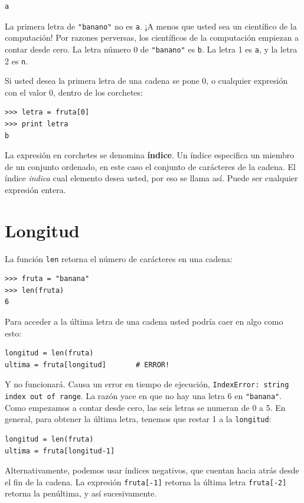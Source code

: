 \beforeverb
\begin{verbatim}
a
\end{verbatim}
\afterverb
%
La primera letra de \texttt{"banano"} no es \texttt{a}.  ¡A menos que usted
sea un científico de la computación! Por  razones perversas, los 
científicos de la computación empiezan a contar desde cero. La letra número 
0 de \texttt{"banano"} es \texttt{b}.  La letra 1 es \texttt{a}, y la letra
 2 es \texttt{n}.

Si usted desea la primera letra de una cadena se pone 0, o cualquier
expresión con el valor 0, dentro de los corchetes:


\beforeverb
\begin{verbatim}
>>> letra = fruta[0]
>>> print letra
b
\end{verbatim}
\afterverb
%
La expresión en corchetes se denomina {\bf índice}.  Un índice
especifica un miembro de un conjunto ordenado, en este caso el 
conjunto de carácteres de la cadena. El índice  {\em indica} cual
elemento desea usted, por eso se llama así. Puede ser cualquier expresión
entera.



\section{Longitud}

La función  \texttt{len} retorna el número de carácteres en una cadena:

\beforeverb
\begin{verbatim}
>>> fruta = "banana"
>>> len(fruta)
6
\end{verbatim}
\afterverb
%
Para acceder a la última letra de una cadena usted podría caer en algo
como esto:

\beforeverb
\begin{verbatim}
longitud = len(fruta)
ultima = fruta[longitud]       # ERROR!
\end{verbatim}
\afterverb
%
Y no funcionará. Causa un error en tiempo de ejecución, \texttt{IndexError: string
index out of range}.  La razón yace en que no hay una letra 6 en 
\texttt{"banana"}.  Como empezamos a contar desde cero, las seis letras
se numeran de 0 a 5. En general, para obtener la última letra, tenemos que restar 1 a  la \texttt{longitud}:


\beforeverb
\begin{verbatim}
longitud = len(fruta)
ultima = fruta[longitud-1]
\end{verbatim}
\afterverb
%
Alternativamente, podemos usar índices negativos, que cuentan hacia atrás 
desde el fin de la cadena. La expresión \texttt{fruta[-1]} retorna la última letra
\texttt{fruta[-2]} retorna la penúltima, y así sucesivamente.

